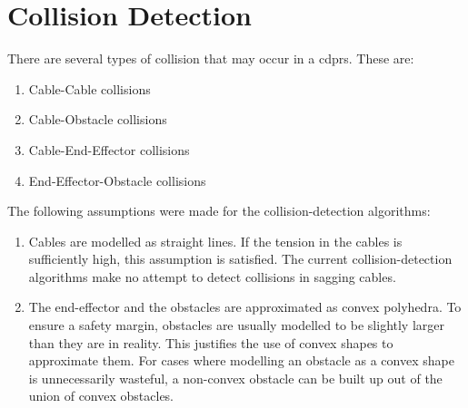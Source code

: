 \chapter{Collision Detection}%
\label{chap:collision_detection}

	There are several types of collision that may occur in a \glspl{cdpr}. These
	are:

	\begin{enumerate}

		\item Cable-Cable collisions

		\item Cable-Obstacle collisions

		\item Cable-End-Effector collisions

		\item End-Effector-Obstacle collisions

	\end{enumerate}

	The following assumptions were made for the collision-detection
	algorithms:

	\begin{enumerate}

		\item

			Cables are modelled as straight lines. If the tension in the cables
			is sufficiently high, this assumption is satisfied. The current
			collision-detection algorithms make no attempt to detect collisions
			in sagging cables.

		\item

			The end-effector and the obstacles are approximated as convex
			polyhedra. To ensure a safety margin, obstacles are usually modelled
			to be slightly larger than they are in reality. This justifies the
			use of convex  shapes to approximate them. For cases where modelling
			an obstacle as a convex shape is unnecessarily wasteful, a
			non-convex obstacle can be built up out of the union of convex
			obstacles.

	\end{enumerate}

	
	
	
	
	
	
